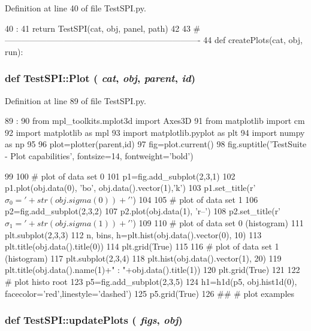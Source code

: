 Definition at line 40 of file TestSPI.py.


\begin{DoxyCode}
40                                 :
41     return TestSPI(cat, obj, panel, path)
42 
43 #----------------------------------------------------------------------
44 
def createPlots(cat, obj, run):
\end{DoxyCode}
\hypertarget{namespaceTestSPI_aeae7bd62487a521487e2c5a3a1c3a6e7}{
\subsubsection[{Plot}]{\setlength{\rightskip}{0pt plus 5cm}def TestSPI::Plot ( {\em cat}, \/   {\em obj}, \/   {\em parent}, \/   {\em id})}}
\label{namespaceTestSPI_aeae7bd62487a521487e2c5a3a1c3a6e7}


Definition at line 89 of file TestSPI.py.


\begin{DoxyCode}
89                               :
90     from mpl_toolkits.mplot3d import Axes3D
91     from matplotlib import cm
92     import matplotlib as mpl
93     import matplotlib.pyplot as plt
94     import numpy as np
95 
96     plot=plotter(parent,id)
97     fig=plot.current()
98     fig.suptitle('TestSuite - Plot capabilities', fontsize=14, fontweight='bold')
      
99     
100     # plot of data set 0
101     p1=fig.add_subplot(2,3,1)
102     p1.plot(obj.data(0), 'bo', obj.data().vector(1),'k')
103     p1.set_title(r'$\sigma_0='+str(obj.sigma(0))+'$')
104     
105     # plot of data set 1
106     p2=fig.add_subplot(2,3,2)
107     p2.plot(obj.data(1), 'r--')
108     p2.set_title(r'$\sigma_1='+str(obj.sigma(1))+'$')
109     
110     # plot of data set 0 (histogram)
111     plt.subplot(2,3,3)
112     n, bins, h=plt.hist(obj.data().vector(0), 10)
113     plt.title(obj.data().title(0))    
114     plt.grid(True)
115 
116     # plot of data set 1 (histogram)    
117     plt.subplot(2,3,4)
118     plt.hist(obj.data().vector(1), 20)
119     plt.title(obj.data().name(1)+" : "+obj.data().title(1))
120     plt.grid(True)
121 
122     # plot histo root
123     p5=fig.add_subplot(2,3,5)
124     h1=h1d(p5, obj.hist1d(0), facecolor='red',linestyle='dashed')
125     p5.grid(True)
126 
##     # plot examples
\end{DoxyCode}
\hypertarget{namespaceTestSPI_af2d9c99fbaf7eb8abe974ea72714a904}{
\subsubsection[{updatePlots}]{\setlength{\rightskip}{0pt plus 5cm}def TestSPI::updatePlots ( {\em figs}, \/   {\em obj})}}
\label{namespaceTestSPI_af2d9c99fbaf7eb8abe974ea72714a904}


